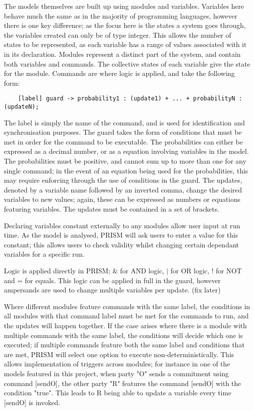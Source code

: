 \documentclass{l4proj}
\begin{document}
The models themselves are built up using modules and variables. Variables here behave much the same as in the majority of programming languages, however there is one key difference; as the focus here is the states a system goes through, the variables created can only be of type integer. This allows the number of states to be represented, as each variable has a range of values associated with it in its declaration. Modules represent a distinct part of the system, and contain both variables and commands. The collective states of each variable give the state for the module. Commands are where logic is applied, and take the following form: 

\begin{lstlisting}
    [label] guard -> probability1 : (update1) + ... + probabilityN : (updateN);
\end{lstlisting}

The label is simply the name of the command, and is used for identification and synchronisation purposes. The guard takes the form of conditions that must be met in order for the command to be executable. The probabilities can either be expressed as a decimal number, or as a equation involving variables in the model. The probabilities must be positive, and cannot sum up to more than one for any single command; in the event of an equation being used for the probabilities, this may require enforcing through the use of conditions in the guard. The updates, denoted by a variable name followed by an inverted comma, change the desired variables to new values; again, these can be expressed as numbers or equations featuring variables. The updates must be contained in a set of brackets.

Declaring variables constant externally to any modules allow user input at run time. As the model is analysed, PRISM will ask users to enter a value for this constant; this allows users to check validity whilst changing certain dependant variables for a specific run.

Logic is applied directly in PRISM; $ \& $ for AND logic, $ \mid $ for OR logic, ! for NOT and = for equals. This logic can be applied in full in the guard, however ampersands are used to change multiple variables per update. (fix later)

Where different modules feature commands with the same label, the conditions in all modules with that command label must be met for the commands to run, and the updates will happen together. If the case arises where there is a module with multiple commands with the same label, the conditions will decide which one is executed; if multiple commands feature both the same label and conditions that are met, PRISM will select one option to execute non-deterministically. This allows implementation of triggers across modules; for instance in one of the models featured in this project, when party "O" sends a commitment using command [sendO], the other party "R" features the command [sendO] with the condition "true". This leads to R being able to update a variable every time [sendO] is invoked.
\end{document}
